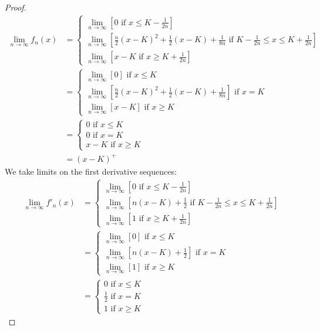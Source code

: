\documentclass{article}
\newcommand{\limit}[1]{\underset{#1}{\lim}}
\theoremstyle{definition}
\theoremstyle{definition}
\begin{document}
\begin{enumerate}
\begin{enumerate}[(i)]
        \begin{proof}
             \begin{align*} \limit{n \to \infty} f_n(x)  &= \begin{cases} 
        \limit{n\to \infty}\left[ 0 \text{ if } x \leq K - \frac{1}{2n} \right] \\
         \limit{n\to \infty} \left[ \frac{n}{2}(x-K)^2+\frac{1}{2}(x-K)+\frac{1}{8n}  \text{ if } K-\frac{1}{2n} \leq x \leq K + \frac{1}{2n}\right]\\
         \limit{n\to \infty} \left[ x-K \text{ if } x \geq K + \frac{1}{2n} \right]
        \end{cases} \\
        &=\begin{cases} 
        \limit{n\to \infty}\left[0\right] \text{ if } x \leq K  \\
         \limit{n\to \infty} \left[ \frac{n}{2}(x-K)^2+\frac{1}{2}(x-K)+\frac{1}{8n} \right] \text{ if } x=K \\
         \limit{n\to \infty} \left[ x-K \right] \text{ if } x \geq K 
        \end{cases} \\
        &=\begin{cases} 
        0\text{ if } x \leq K  \\
        0 \text{ if } x=K \\
         x-K \text{ if } x \geq K 
        \end{cases}  \\ &= (x-K)^+
        \end{align*}
We take limits on the first derivative sequences:
        \begin{align*}
           \limit{n \to \infty} f'_n(x)  &= \begin{cases} 
        \limit{n \to \infty} \left[ 0 \text{ if } x \leq K - \frac{1}{2n} \right] \\
       \limit{n \to \infty} \left[ n(x-K)+\frac{1}{2} \text{ if } K-\frac{1}{2n} \leq x \leq K + \frac{1}{2n}  \right] \\
        \limit{n \to \infty} \left[ 1 \text{ if } x \geq K + \frac{1}{2n} \right]
        \end{cases} \\
          &= \begin{cases} 
        \limit{n \to \infty} \left[ 0 \right] \text{ if } x \leq K   \\
       \limit{n \to \infty} \left[ n(x-K)+\frac{1}{2} \right] \text{ if } x=K \\
        \limit{n \to \infty} \left[ 1\right] \text{ if } x \geq K   \end{cases} \\
        &= \begin{cases} 
         0 \text{ if } x \leq K   \\
      \frac{1}{2} \text{ if } x=K \\
        1 \text{ if } x \geq K  
        \end{cases}
        \end{align*}


\end{proof}
\end{enumerate}
\end{enumerate}
\end{document}
